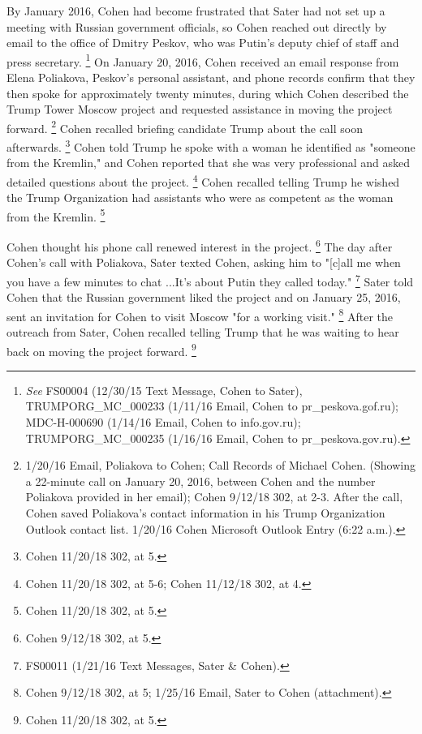 By January 2016, Cohen had become frustrated that Sater had not set up a meeting with Russian government officials, so Cohen reached out directly by email to the office of Dmitry Peskov, who was Putin's deputy chief of staff and press secretary.%
\footnote{\textit{See} FS00004 (12/30/15 Text Message, Cohen to Sater), TRUMPORG\_MC\_000233 (1/11/16 Email, Cohen to pr\_peskova\@prpress.gof.ru);
MDC-H-000690 (1/14/16 Email, Cohen to info\@prpress.gov.ru);
TRUMPORG\_MC\_000235 (1/16/16 Email, Cohen to pr\_peskova\@prpress.gov.ru).}
On January 20, 2016, Cohen received an email response from Elena Poliakova, Peskov's personal assistant, and phone records confirm that they then spoke for approximately twenty minutes, during which Cohen described the Trump Tower Moscow project and requested assistance in moving the project forward.%
\footnote{1/20/16 Email, Poliakova to Cohen;
Call Records of Michael Cohen.
(Showing a 22-minute call on January 20, 2016, between Cohen and the number Poliakova provided in her email);
Cohen 9/12/18 302, at 2-3.
After the call, Cohen saved Poliakova’s contact information in his Trump Organization Outlook contact list.
1/20/16 Cohen Microsoft Outlook Entry (6:22 a.m.).}
Cohen recalled briefing candidate Trump about the call soon afterwards.%
\footnote{Cohen 11/20/18 302, at 5.}
Cohen told Trump he spoke with a woman he identified as "someone from the Kremlin," and Cohen reported that she was very professional and asked detailed questions about the project.%
\footnote{Cohen 11/20/18 302, at 5-6;
Cohen 11/12/18 302, at 4.}
Cohen recalled telling Trump he wished the Trump Organization had assistants who were as competent as the woman from the Kremlin.%
\footnote{Cohen 11/20/18 302, at 5.}

Cohen thought his phone call renewed interest in the project.%
\footnote{Cohen 9/12/18 302, at 5.}
The day after Cohen's call with Poliakova, Sater texted Cohen, asking him to "[c]all me when you have a few minutes to chat ...It's about Putin they called today."%
\footnote{FS00011 (1/21/16 Text Messages, Sater \& Cohen).}
Sater told Cohen that the Russian government liked the project and on January 25, 2016, sent an invitation for Cohen to visit Moscow "for a working visit."%
\footnote{Cohen 9/12/18 302, at 5;
1/25/16 Email, Sater to Cohen (attachment).}
After the outreach from Sater, Cohen recalled telling Trump that he was waiting to hear back on moving the project forward.%
\footnote{Cohen 11/20/18 302, at 5.}

